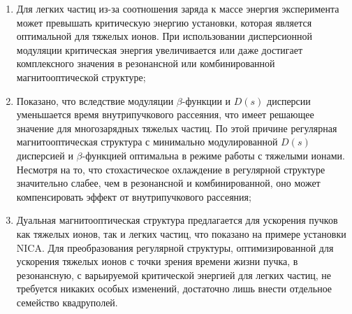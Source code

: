\begin{enumerate}

\item  Для легких частиц из-за соотношения заряда к массе энергия эксперимента может превышать критическую энергию установки, которая является оптимальной для тяжелых ионов. При использовании дисперсионной модуляции критическая энергия увеличивается или даже достигает комплексного значения в резонансной или комбинированной магнитооптической структуре;

\item Показано, что вследствие модуляции $\beta$-функции и $D(s)$ дисперсии уменьшается время внутрипучкового рассеяния, что имеет решающее значение для многозарядных тяжелых частиц. По этой причине регулярная магнитооптическая структура с минимально модулированной $D(s)$ дисперсией и $\beta$-функцией оптимальна в режиме работы с тяжелыми ионами. Несмотря на то, что стохастическое охлаждение в регулярной структуре значительно слабее, чем в резонансной и комбинированной, оно может компенсировать эффект от внутрипучкового рассеяния;

\item Дуальная магнитооптическая структура предлагается для ускорения пучков как тяжелых ионов, так и легких частиц, что показано на примере установки NICA. Для преобразования регулярной структуры, оптимизированной для ускорения тяжелых ионов с точки зрения времени жизни пучка, в резонансную, с варьируемой критической энергией для легких частиц, не требуется никаких особых изменений, достаточно лишь внести отдельное семейство квадруполей.

\end{enumerate}

\FloatBarrier
